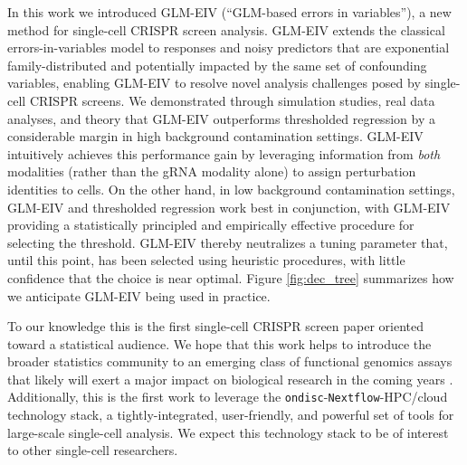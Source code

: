 \documentclass[12pt]{article}
\begin{document}
In this work we introduced GLM-EIV (``GLM-based errors in variables''), a new method for single-cell CRISPR screen analysis. GLM-EIV extends the classical errors-in-variables model to responses and noisy predictors that are exponential family-distributed and potentially impacted by the same set of confounding variables, enabling GLM-EIV to resolve novel analysis challenges posed by single-cell CRISPR screens. We demonstrated through simulation studies, real data analyses, and theory that GLM-EIV outperforms thresholded regression by a considerable margin in high background contamination settings. GLM-EIV intuitively achieves this performance gain by leveraging information from \textit{both} modalities (rather than the gRNA modality alone) to assign perturbation identities to cells. On the other hand, in low background contamination settings, GLM-EIV and thresholded regression work best in conjunction, with GLM-EIV providing a statistically principled and empirically effective procedure for selecting the threshold. GLM-EIV thereby neutralizes a tuning parameter that, until this point, has been selected using heuristic procedures, with little confidence that the choice is near optimal. Figure \ref{fig:dec_tree} summarizes how we anticipate GLM-EIV being used in practice.

To our knowledge this is the first single-cell CRISPR screen paper oriented toward a statistical audience. We hope that this work helps to introduce the broader statistics community to an emerging class of functional genomics assays that likely will exert a major impact on biological research in the coming years \parencite{Przybyla2021}. Additionally, this is the first work to leverage the \texttt{ondisc}-\texttt{Nextflow}-HPC/cloud technology stack, a tightly-integrated, user-friendly, and powerful set of tools for large-scale single-cell analysis. We expect this technology stack to be of interest to other single-cell researchers.
\end{document}
